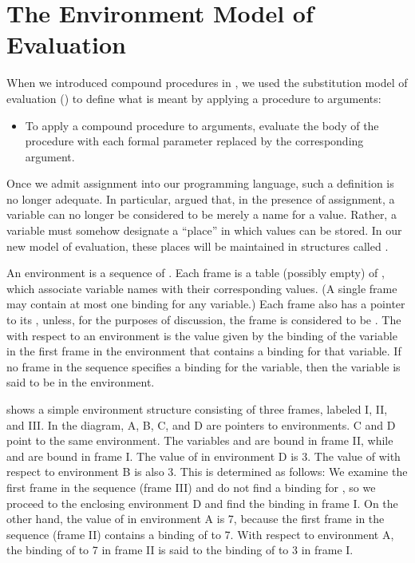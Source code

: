 \section{The Environment Model of Evaluation}
\label{Section 3.2}

When we introduced compound procedures in , we used the
substitution model of evaluation () to define what is meant
by applying a procedure to arguments:

\begin{itemize}

\item
To apply a compound procedure to arguments, evaluate the body of the procedure
with each formal parameter replaced by the corresponding argument.

\end{itemize}

\noindent
Once we admit assignment into our programming language, such a definition is no
longer adequate.  In particular,  argued that, in the
presence of assignment, a variable can no longer be considered to be merely a
name for a value.  Rather, a variable must somehow designate a ``place'' in
which values can be stored.  In our new model of evaluation, these places will
be maintained in structures called .

An environment is a sequence of .  Each frame is a table
(possibly empty) of , which associate variable names with
their corresponding values.  (A single frame may contain at most one binding
for any variable.)  Each frame also has a pointer to its , unless, for the purposes of discussion, the frame is considered
to be .  The  with respect to an
environment is the value given by the binding of the variable in the first
frame in the environment that contains a binding for that variable.  If no
frame in the sequence specifies a binding for the variable, then the variable
is said to be  in the environment.

 shows a simple environment structure consisting of three
frames, labeled I, II, and III.  In the diagram, A, B, C, and D are pointers to
environments.  C and D point to the same environment.  The variables 
and  are bound in frame II, while  and  are bound in
frame I.  The value of  in environment D is 3.  The value of 
with respect to environment B is also 3.  This is determined as follows: We
examine the first frame in the sequence (frame III) and do not find a binding
for , so we proceed to the enclosing environment D and find the binding
in frame I.  On the other hand, the value of  in environment A is 7,
because the first frame in the sequence (frame II) contains a binding of
 to 7.  With respect to environment A, the binding of  to 7 in
frame II is said to  the binding of  to 3 in frame I.


